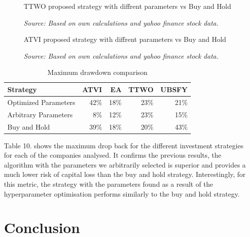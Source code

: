 \documentclass[review]{elsarticle} %
\begin{document}
\begin{figure}[H]
\caption{TTWO proposed strategy with diffrent parameters vs Buy and Hold}
\begin{adjustbox}{width=1.3\textwidth,center}

\end{adjustbox}
\caption*{\textit{Source: Based on own calculations and yahoo finance stock data.}}
\end{figure}

\begin{figure}[H]
\caption{ATVI proposed strategy with diffrent parameters vs Buy and Hold}
\begin{adjustbox}{width=1.3\textwidth,center}

\end{adjustbox}
\caption*{\textit{Source: Based on own calculations and yahoo finance stock data.}}
\end{figure}

\begin{table}[H]
       \centering
       \caption{Maximum drawdown comparison}
       \begin{tabular}{lrrrr}
       \toprule
        Strategy &  ATVI &   EA &   TTWO &   UBSFY \\
       \midrule
       Optimized Parameters & 42\% & 18\% & 23\% & 21\% \\
       Arbitrary Parameters & 8\% & 12\% & 23\% & 15\% \\
       Buy and Hold & 39\% & 18\% & 20\% & 43\% \\
       \bottomrule
       \end{tabular}
       \end{table}
       
       Table 10. shows the maximum drop back for the different investment strategies for each of the companies analysed. It confirms the previous results, the algorithm with the parameters we arbitrarily selected is superior and provides a much lower risk of capital loss than the buy and hold strategy. Interestingly, for this metric, the strategy with the parameters found as a result of the hyperparameter optimisation performs similarly to the buy and hold strategy.

\section{Conclusion}
\end{document}
